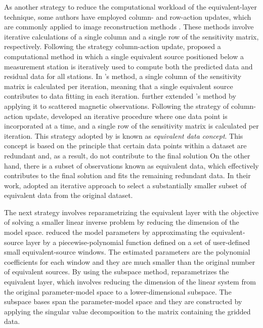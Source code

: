 \documentclass[utf8]{FrontiersinHarvard} %
\begin{document}
	As another strategy to reduce the computational workload of the equivalent-layer technique, some authors 
	have employed column- and row-action updates, which are commonly applied to image reconstruction methods \citep[e.g.,][]{elfving-etal2017}. 
	These methods involve iterative calculations of a single column and a single row of the sensitivity matrix, respectively.
	Following the strategy column-action update, \cite{cordell1992} proposed a computational method in which a single equivalent source positioned below a measurement station is iteratively used to compute both the predicted data and residual data for all stations. 
	In  \citeauthor{cordell1992}'s method, a single column of the sensitivity matrix is calculated per iteration, meaning that a single equivalent source contributes to data fitting in each iteration. 
	\cite{guspi-novara2009} further extended  \citeauthor{cordell1992}'s method 
	by applying it to scattered magnetic observations.
	Following the strategy of column-action update, \cite{mendonca-silva1994} developed an iterative procedure where one data point is incorporated at a time, and a single row of the sensitivity matrix is calculated per iteration.
	This strategy adopted by \cite{mendonca-silva1994} is known as \textit{equivalent data concept}.
	This concept is based on the principle that certain data points within a dataset are redundant and, as a result, do not contribute to the final solution
	On the other hand, there is a subset of observations known as equivalent data, which effectively contributes to the final solution and fits the remaining redundant data. 
	In their work, \cite{mendonca-silva1994} adopted an iterative approach to select a substantially smaller subset of equivalent data from the original dataset. 
	
	
	The next strategy involves reparametrizing the equivalent layer with the objective of solving a 
	smaller linear inverse problem by reducing the dimension of the model space.
	\cite{oliveirajr-etal2013} reduced the model parameters by approximating the equivalent-source layer by a piecewise-polynomial function defined on a set of user-defined small equivalent-source windows. 
	The estimated parameters are the polynomial coefficients for each window and they are much smaller than the original number of equivalent sources.
	By using the subspace method, \cite{mendonca2020} reparametrizes the equivalent layer, which involves 
	reducing the dimension of the linear system from the original parameter-model space to a lower-dimensional subspace.
	The subspace bases span the parameter-model space and they are constructed by applying the singular value decomposition to the matrix containing the gridded data.
	
\end{document}
